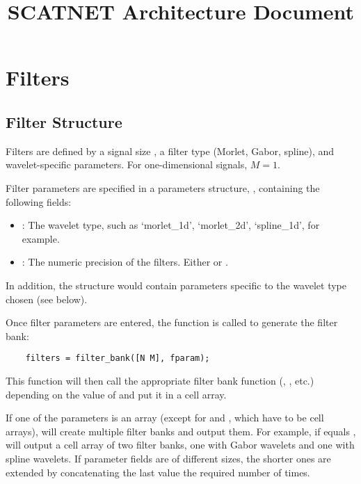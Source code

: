 \documentclass[twocolumn]{article}
\title{SCATNET Architecture Document}
\begin{document}
	
\maketitle

\section{Filters}

\subsection{Filter Structure}

Filters are defined by a signal size \mcode{[N,M]}, a filter type (Morlet, Gabor, spline), and wavelet-specific parameters. For one-dimensional signals, $M = 1$.

Filter parameters are specified in a parameters structure, , containing the following fields:
\begin{itemize}
	\item {}: The wavelet type, such as `morlet\_1d', `morlet\_2d', `spline\_1d', for example.
	\item {}: The numeric precision of the filters. Either  or .
\end{itemize}
In addition, the  structure would contain parameters specific to the wavelet type chosen (see below).

Once filter parameters are entered, the  function is called
to generate the filter bank:
\begin{lstlisting}
	filters = filter_bank([N M], fparam);
\end{lstlisting}
This function will then call the appropriate filter bank function (, , etc.) depending on the value of  and put it in a cell array. 

If one of the parameters is an array (except for  and , which have to be cell arrays),  will create multiple filter banks and output them. For example, if  equals ,  will output a cell array of two filter banks, one with Gabor wavelets and one with spline wavelets. If parameter fields are of different sizes, the shorter ones are extended by concatenating the last value the required number of times.
\end{document}
